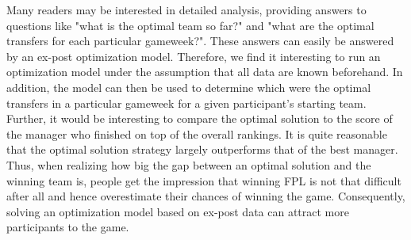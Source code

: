 
\newpar

Many readers may be interested in detailed analysis, providing answers to questions like "what is the optimal team so far?" and "what are the optimal transfers for each particular gameweek?". These answers can easily be answered by an ex-post optimization model. Therefore, we find it interesting to run an optimization model under the assumption that all data are known beforehand. In addition, the model can then be used to determine which were the optimal transfers in a particular gameweek for a given participant's starting team. Further, it would be interesting to compare the optimal solution to the score of the manager who finished on top of the overall rankings. It is quite reasonable that the optimal solution strategy largely outperforms that of the best manager. Thus, when realizing how big the gap between an optimal solution and the winning team is, people get the impression that winning FPL is not that difficult after all and hence overestimate their chances of winning the game. Consequently, solving an optimization model based on ex-post data can attract more participants to the game.

